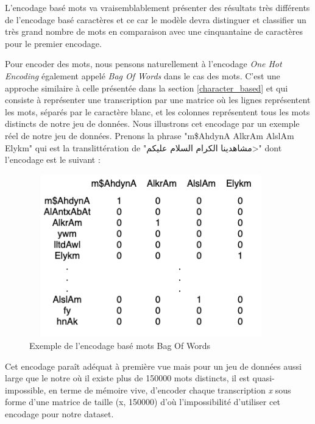 L'encodage basé mots va vraisemblablement présenter des résultats très différents de l'encodage basé caractères et ce car le modèle devra distinguer et classifier un très grand nombre de mots en comparaison avec une cinquantaine de caractères pour le premier encodage. 

Pour encoder des mots,  nous pensons naturellement à l'encodage \textit{One Hot Encoding} également appelé \textit{Bag Of Words} dans le cas des mots. C'est une approche similaire à celle présentée dans la section  \ref{character_based} et qui consiste à représenter une transcription par une matrice où les lignes représentent les mots, séparés par le caractère blanc, et les colonnes représentent tous les mots distincts de notre jeu de données. Nous illustrons cet encodage par un exemple réel de notre jeu de données. Prenons la phrase "m\$AhdynA AlkrAm AlslAm Elykm" qui est la translittération de "\<مشاهدينا الكرام السلام عليكم>" dont l'encodage est le suivant :  

\begin{figure}[H]
    \centering
    \includegraphics[height=200pt,width=300pt]{images/chap3/One-Hot-Word-level.png}
    \caption{Exemple de l'encodage basé mots Bag Of Words}
    \label{exemple_bag_of_words}
\end{figure}

Cet encodage paraît adéquat à première vue mais pour un jeu de données aussi large que le notre où il existe plus de 150000 mots distincts, il est quasi-impossible, en terme de mémoire vive, d'encoder chaque transcription \textit{x} sous forme d'une matrice de taille (x, 150000) d'où l'impossibilité d'utiliser cet encodage pour notre dataset.

